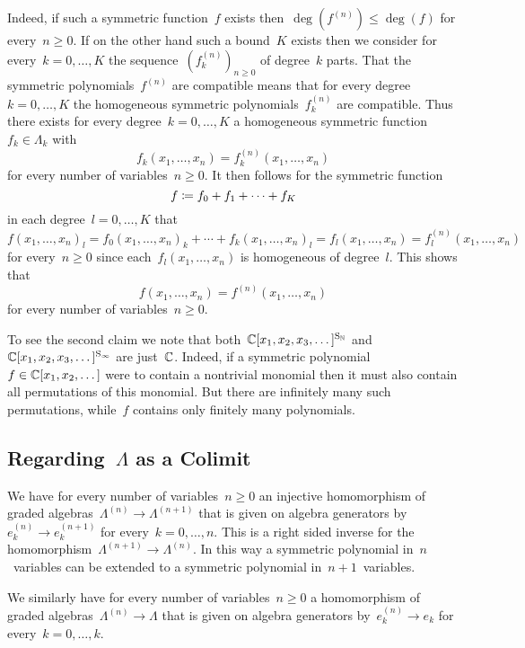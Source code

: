 \documentclass[a4paper,11pt]{scrartcl}
\begin{document}
Indeed, if such a symmetric function~$f$ exists then~$\deg( f^{(n)} ) \leq \deg(f)$ for every~$n \geq 0$.
If on the other hand such a bound~$K$ exists then we consider for every~$k = 0, \dotsc, K$ the sequence~$( f^{(n)}_k )_{n \geq 0}$ of degree~$k$ parts.
That the symmetric polynomials~$f^{(n)}$ are compatible means that for every degree~$k = 0, \dotsc, K$ the homogeneous symmetric polynomials~$f^{(n)}_k$ are compatible.
Thus there exists for every degree~$k = 0, \dotsc, K$ a homogeneous symmetric function~$f_k \in \Lambda_k$ with
\[
  f_k(x_1, \dots, x_n)
  =
  f^{(n)}_k(x_1, \dotsc, x_n)
\]
for every number of variables~$n \geq 0$.
It then follows for the symmetric function
\[
  f
  \coloneqq
  f_0 + f_1 + \dotsb + f_K
\]
in each degree~$l = 0, \dotsc, K$ that
\[
  f(x_1, \dotsc, x_n)_l
  =
  f_0(x_1, \dotsc, x_n)_k
  +
  \dotsb
  +
  f_k(x_1, \dotsc, x_n)_l
  =
  f_l(x_1, \dotsc, x_n)
  =
  f^{(n)}_l(x_1, \dotsc, x_n)
\]
for every~$n \geq 0$ since each~$f_l(x_1, \dotsc, x_n)$ is homogeneous of degree~$l$.
This shows that
\[
  f(x_1, \dotsc, x_n)
  =
  f^{(n)}(x_1, \dotsc, x_n)
\]
for every number of variables~$n \geq 0$.

To see the second claim we note that both~$\mathbb{C}[x_1, x_2, x_3, \dotsc]^{\mathrm{S}_{\mathbb{N}}}$ and~$\mathbb{C}[x_1, x_2, x_3, \dotsc]^{\mathrm{S}_\infty}$ are just~$\mathbb{C}$.
Indeed, if a symmetric polynomial~$f \in \mathbb{C}[x_1, x_2, \dotsc]$ were to contain a nontrivial monomial then it must also contain all permutations of this monomial.
But there are infinitely many such permutations, while~$f$ contains only finitely many polynomials.


\subsection{Regarding~$\Lambda$ as a Colimit}
\label{symmetric functions as colimit}

We have for every number of variables~$n \geq 0$ an injective homomorphism of graded algebras~$\Lambda^{(n)} \to \Lambda^{(n+1)}$ that is given on algebra generators by~$e^{(n)}_k \to e^{(n+1)}_k$ for every~$k = 0, \dotsc, n$.
This is a right sided inverse for the homomorphism~$\Lambda^{(n+1)} \to \Lambda^{(n)}$.
In this way a symmetric polynomial in~$n$~variables can be extended to a symmetric polynomial in~$n+1$~variables.

We similarly have for every number of variables~$n \geq 0$ a homomorphism of graded algebras~$\Lambda^{(n)} \to \Lambda$ that is given on algebra generators by~$e^{(n)}_k \to e_k$ for every~$k = 0, \dotsc, k$.
\end{document}
